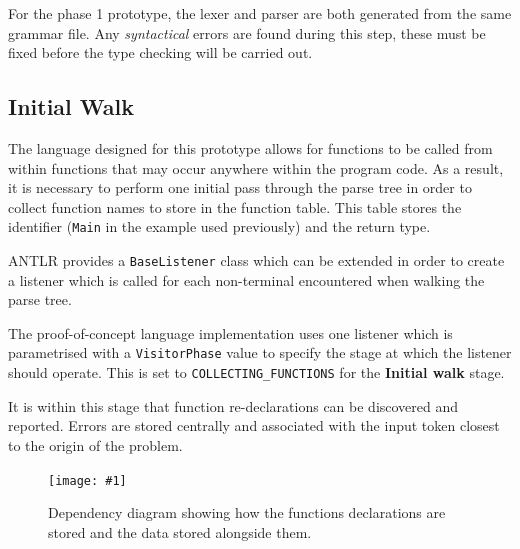 \documentclass[a4paper]{article}
\newcommand{\widthboxedfigure}[3]{\begin{MyMdframed}\begin{figure}[H]
            \begin{center}\vspace{2em}\texttt{[image: \#1]}\end{center}
            \caption{#2}
\end{figure}\end{MyMdframed}}
\begin{document}
    For the phase 1 prototype, the lexer and parser are both generated from the same grammar file. Any \emph{syntactical} errors are found during this step, these must be fixed before the type checking will be carried out.
    
    \subsection*{Initial Walk}
    
    \hfill{}

    The language designed for this prototype allows for functions to be called from within functions that may occur anywhere within the program code. As a result, it is necessary to perform one initial pass through the parse tree in order to collect function names to store in the function table. This table stores the identifier (\texttt{Main} in the example used previously) and the return type.
    
    ANTLR provides a \texttt{BaseListener} class which can be extended in order to create a listener which is called for each non-terminal encountered when walking the parse tree.
    
    The proof-of-concept language implementation uses one listener which is parametrised with a \texttt{VisitorPhase} value to specify the stage at which the listener should operate. This is set to \texttt{COLLECTING\_FUNCTIONS} for the \textbf{Initial walk} stage.
    
    It is within this stage that function re-declarations can be discovered and reported. Errors are stored centrally and associated with the input token closest to the origin of the problem.
    
    \widthboxedfigure{FunctionTable.png}{Dependency diagram showing how the functions declarations are stored and the data stored alongside them.}{0.5}
    
\end{document}
